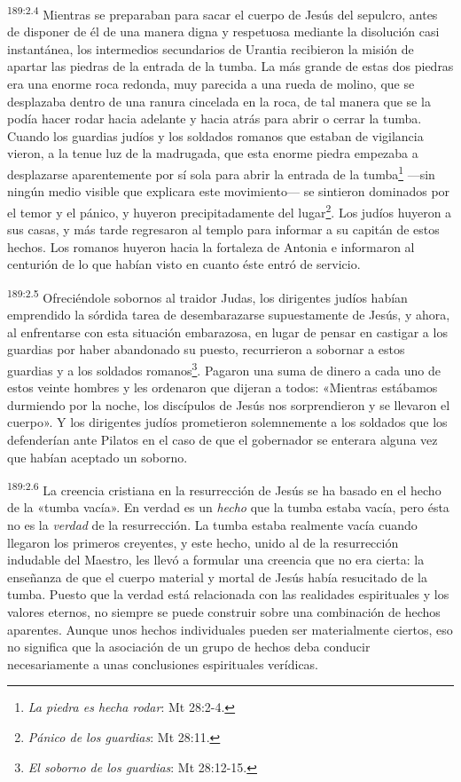 \par 
\textsuperscript{189:2.4} Mientras se preparaban para sacar el cuerpo de Jesús del sepulcro, antes de disponer de él de una manera digna y respetuosa mediante la disolución casi instantánea, los intermedios secundarios de Urantia recibieron la misión de apartar las piedras de la entrada de la tumba. La más grande de estas dos piedras era una enorme roca redonda, muy parecida a una rueda de molino, que se desplazaba dentro de una ranura cincelada en la roca, de tal manera que se la podía hacer rodar hacia adelante y hacia atrás para abrir o cerrar la tumba. Cuando los guardias judíos y los soldados romanos que estaban de vigilancia vieron, a la tenue luz de la madrugada, que esta enorme piedra empezaba a desplazarse aparentemente por sí sola para abrir la entrada de la tumba\footnote{\textit{La piedra es hecha rodar}: Mt 28:2-4.} ---sin ningún medio visible que explicara este movimiento--- se sintieron dominados por el temor y el pánico, y huyeron precipitadamente del lugar\footnote{\textit{Pánico de los guardias}: Mt 28:11.}. Los judíos huyeron a sus casas, y más tarde regresaron al templo para informar a su capitán de estos hechos. Los romanos huyeron hacia la fortaleza de Antonia e informaron al centurión de lo que habían visto en cuanto éste entró de servicio.

\par 
\textsuperscript{189:2.5} Ofreciéndole sobornos al traidor Judas, los dirigentes judíos habían emprendido la sórdida tarea de desembarazarse supuestamente de Jesús, y ahora, al enfrentarse con esta situación embarazosa, en lugar de pensar en castigar a los guardias por haber abandonado su puesto, recurrieron a sobornar a estos guardias y a los soldados romanos\footnote{\textit{El soborno de los guardias}: Mt 28:12-15.}. Pagaron una suma de dinero a cada uno de estos veinte hombres y les ordenaron que dijeran a todos: «Mientras estábamos durmiendo por la noche, los discípulos de Jesús nos sorprendieron y se llevaron el cuerpo». Y los dirigentes judíos prometieron solemnemente a los soldados que los defenderían ante Pilatos en el caso de que el gobernador se enterara alguna vez que habían aceptado un soborno.

\par 
\textsuperscript{189:2.6} La creencia cristiana en la resurrección de Jesús se ha basado en el hecho de la «tumba vacía». En verdad es un \textit{hecho} que la tumba estaba vacía, pero ésta no es la \textit{verdad} de la resurrección. La tumba estaba realmente vacía cuando llegaron los primeros creyentes, y este hecho, unido al de la resurrección indudable del Maestro, les llevó a formular una creencia que no era cierta: la enseñanza de que el cuerpo material y mortal de Jesús había resucitado de la tumba. Puesto que la verdad está relacionada con las realidades espirituales y los valores eternos, no siempre se puede construir sobre una combinación de hechos aparentes. Aunque unos hechos individuales pueden ser materialmente ciertos, eso no significa que la asociación de un grupo de hechos deba conducir necesariamente a unas conclusiones espirituales verídicas.

